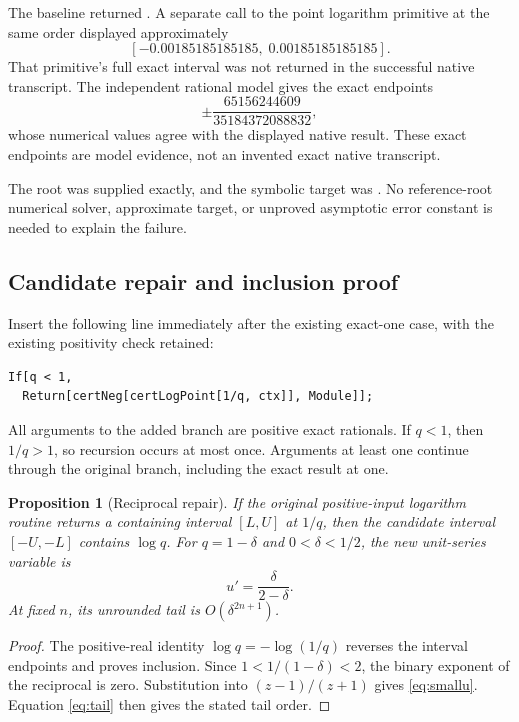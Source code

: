 \documentclass[11pt,letterpaper]{article}
\newcommand{\code}[1]{\texttt{\detokenize{#1}}}
\newtheorem{proposition}{Proposition}[section]
\theoremstyle{remark}\newtheorem{remark}[proposition]{Remark}
\begin{document}
The baseline returned
\code{Failure["ResidualBracketOutsideInterval", ...]}. A separate call to
the point logarithm primitive at the same order displayed approximately
\[
 [-0.00185185185185,\;0.00185185185185].
\]
That primitive's full exact interval was not returned in the successful
native transcript. The independent rational model gives the exact endpoints
\[
 \pm\frac{65156244609}{35184372088832},
\]
whose numerical values agree with the displayed native result. These exact
endpoints are model evidence, not an invented exact native transcript.

The root was supplied exactly, and the symbolic target was \code{Log[1-d]}.
No reference-root numerical solver, approximate target, or unproved
asymptotic error constant is needed to explain the failure.

\subsection{Candidate repair and inclusion proof}
Insert the following line immediately after the existing exact-one case,
with the existing positivity check retained:
\begin{lstlisting}
If[q < 1,
  Return[certNeg[certLogPoint[1/q, ctx]], Module]];
\end{lstlisting}
All arguments to the added branch are positive exact rationals. If $q<1$,
then $1/q>1$, so recursion occurs at most once. Arguments at least one
continue through the original branch, including the exact result at one.

\begin{proposition}[Reciprocal repair]
If the original positive-input logarithm routine returns a containing
interval $[L,U]$ at $1/q$, then the candidate interval $[-U,-L]$ contains
$\log q$. For $q=1-\delta$ and $0<\delta<1/2$, the new unit-series variable is
\begin{equation}\label{eq:smallu}
 u'=\frac{\delta}{2-\delta}.
\end{equation}
At fixed $n$, its unrounded tail is $O(\delta^{2n+1})$.
\end{proposition}
\begin{proof}
The positive-real identity $\log q=-\log(1/q)$ reverses the interval
endpoints and proves inclusion. Since $1<1/(1-\delta)<2$, the binary
exponent of the reciprocal is zero. Substitution into $(z-1)/(z+1)$ gives
\eqref{eq:smallu}. Equation \eqref{eq:tail} then gives the stated tail order.
\end{proof}
\end{document}
